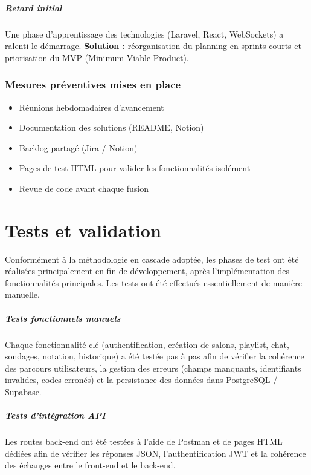 \documentclass[12pt,a4paper]{report}
\begin{document}
\paragraph{Retard initial}
Une phase d’apprentissage des technologies (Laravel, React, WebSockets) a ralenti le démarrage.  
\textbf{Solution :} réorganisation du planning en sprints courts et priorisation du MVP (Minimum Viable Product).

\subsection*{Mesures préventives mises en place}

\begin{itemize}
  \item Réunions hebdomadaires d’avancement
  \item Documentation des solutions (README, Notion)
  \item Backlog partagé (Jira / Notion)
  \item Pages de test HTML pour valider les fonctionnalités isolément
  \item Revue de code avant chaque fusion
\end{itemize}

\chapter{Tests et validation}

Conformément à la méthodologie en cascade adoptée, les phases de test ont été réalisées principalement en fin de développement, après l’implémentation des fonctionnalités principales. Les tests ont été effectués essentiellement de manière manuelle.

\paragraph{Tests fonctionnels manuels}
Chaque fonctionnalité clé (authentification, création de salons, playlist, chat, sondages, notation, historique) a été testée pas à pas afin de vérifier la cohérence des parcours utilisateurs, la gestion des erreurs (champs manquants, identifiants invalides, codes erronés) et la persistance des données dans PostgreSQL / Supabase.

\paragraph{Tests d’intégration API}
Les routes back-end ont été testées à l’aide de Postman et de pages HTML dédiées afin de vérifier les réponses JSON, l’authentification JWT et la cohérence des échanges entre le front-end et le back-end.
\end{document}
